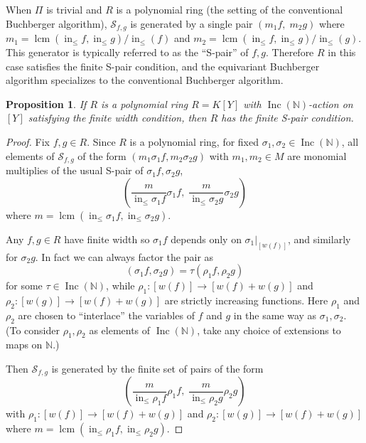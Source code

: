 \documentclass{article}
\theoremstyle{plain}
\newtheorem{proposition}[theorem]{Proposition}
\theoremstyle{definition}
\numberwithin{equation}{section}
\newcommand{\B}[1]{\mathbb #1}
\newcommand{\C}[1]{\mathcal #1}
\DeclareMathOperator{\initial}{in}
\DeclareMathOperator{\lcm}{lcm}
\newcommand{\Inc}{\operatorname{Inc}(\B N)}
\newcommand{\mon}{M}
\newcommand{\LT}{\initial_{\leq}}
\begin{document}
When $\Pi$ is trivial and $R$ is a polynomial ring (the setting of the conventional Buchberger algorithm), $\C S_{f,g}$ is generated by a single pair $(m_1 f,\; m_2 g)$ where $m_1 = \lcm(\LT f, \LT g)/\LT(f)$ and $m_2 = \lcm(\LT f, \LT g)/\LT(g)$.  This generator is typically referred to as the ``S-pair'' of $f,g$.  Therefore $R$ in this case satisfies the finite S-pair condition, and the equivariant Buchberger algorithm specializes to the conventional Buchberger algorithm.

\begin{proposition}
 If $R$ is a polynomial ring $R = K[Y]$ with $\Inc$-action on $[Y]$ satisfying the finite width condition, then $R$ has the finite S-pair condition.
\end{proposition}
\begin{proof}
 Fix $f,g \in R$.
 Since $R$ is a polynomial ring, for fixed $\sigma_1,\sigma_2 \in \Inc$, all elements of $\C S_{f,g}$ of the form $(m_1\sigma_1 f, m_2\sigma_2 g)$ with $m_1,m_2 \in \mon$ are monomial multiplies of the usual S-pair of $\sigma_1 f, \sigma_2 g$,
  \[ \left(\frac{m}{\LT \sigma_1 f} \sigma_1 f,\; \frac{m}{\LT \sigma_2 g} \sigma_2 g\right) \]
 where $m = \lcm(\LT \sigma_1 f,\LT \sigma_2 g)$.

 Any $f,g \in R$ have finite width so $\sigma_1 f$ depends only on $\sigma_1|_{[w(f)]}$, and similarly for $\sigma_2 g$.  In fact we can always factor the pair as
  \[ (\sigma_1 f, \sigma_2 g) = \tau(\rho_1 f, \rho_2 g) \]
 for some $\tau \in \Inc$, while $\rho_1:[w(f)] \to [w(f) + w(g)]$ and $\rho_2:[w(g)] \to [w(f) + w(g)]$ are strictly increasing functions.  Here $\rho_1$ and $\rho_2$ are chosen to ``interlace'' the variables of $f$ and $g$ in the same way as $\sigma_1,\sigma_2$.  (To consider $\rho_1,\rho_2$ as elements of $\Inc$, take any choice of extensions to maps on $\B N$.)
 
 Then $\C S_{f,g}$ is generated by the finite set of pairs of the form
  \[ \left(\frac{m}{\LT \rho_1 f} \rho_1 f,\; \frac{m}{\LT \rho_2 g} \rho_2 g\right) \]
 with $\rho_1:[w(f)] \to [w(f) + w(g)]$ and $\rho_2:[w(g)] \to [w(f) + w(g)]$ where $m = \lcm(\LT \rho_1 f,\LT \rho_2 g)$.
\end{proof}

\end{document}
